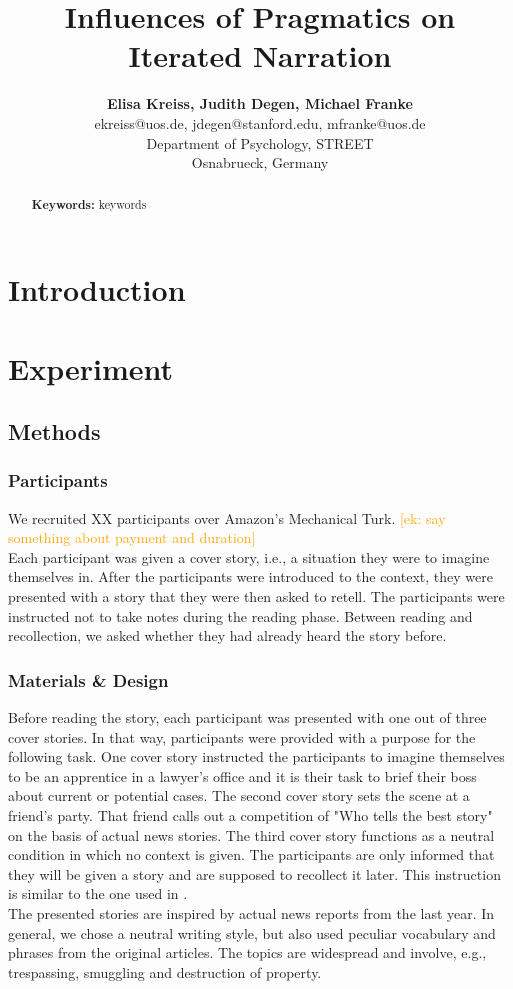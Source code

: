 \documentclass[10pt,letterpaper]{article}
\title{Influences of Pragmatics on Iterated Narration}
\author{{\large \bf Elisa Kreiss, Judith Degen, Michael Franke} \\
  ekreiss@uos.de, jdegen@stanford.edu, mfranke@uos.de\\
  Department of Psychology, STREET \\
  Osnabrueck, Germany}
\newcommand{\ek}[1]{\textcolor{Orange}{[ek: #1]}}
\begin{document}
\maketitle


\begin{abstract}

\textbf{Keywords:} 
keywords
\end{abstract}

\section{Introduction}

\section{Experiment}

\subsection{Methods}

\subsubsection{Participants}
We recruited XX participants over Amazon's Mechanical Turk. 
\ek{say something about payment and duration}\\
Each participant was given a cover story, i.e., a situation they were to imagine themselves in. After the participants were introduced to the context, they were presented with a story that they were then asked to retell. The participants were instructed not to take notes during the reading phase. Between reading and recollection, we asked whether they had already heard the story before. 

\subsubsection{Materials \& Design}
Before reading the story, each participant was presented with one out of three cover stories. In that way, participants were provided with a purpose for the following task. One cover story instructed the participants to imagine themselves to be an apprentice in a lawyer's office and it is their task to brief their boss about current or potential cases. The second cover story sets the scene at a friend's party. That friend calls out a competition of "Who tells the best story" on the basis of actual news stories. The third cover story functions as a neutral condition in which no context is given. The participants are only informed that they will be given a story and are supposed to recollect it later. This instruction is similar to the one used in \cite{Bartlett:1932}.\\
The presented stories are inspired by actual news reports from the last year. In general, we chose a neutral writing style, but also used peculiar vocabulary and phrases from the original articles. The topics are widespread and involve, e.g., trespassing, smuggling and destruction of property.
\end{document}
